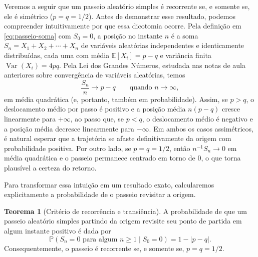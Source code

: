 \documentclass[12pt,portuguese]{article}
\theoremstyle{definition}
\newtheorem{theorem}{Teorema}
\theoremstyle{plainexercise}
\theoremstyle{starredexercise}
\theoremstyle{definition}
\begin{document}
Veremos a seguir que um passeio aleatório simples é recorrente se, e somente se,
ele é simétrico ($p = q = 1/2$). Antes de demonstrar esse resultado, podemos
compreender intuitivamente por que essa dicotomia ocorre. Pela definição em
\eqref{eq:passeio-soma} com $S_0 = 0$, a posição no instante $n$ é a soma
$S_n = X_1 + X_2 + \cdots + X_n$ de variáveis aleatórias independentes e
identicamente distribuídas, cada uma com média $\mathbb{E}[X_i] = p - q$ e
variância finita $\operatorname{Var}(X_i) = 4pq$. Pela Lei dos Grandes Números,
estudada nas notas de aula anteriores sobre convergência de variáveis
aleatórias, temos
\[
\frac{S_n}{n} \to p - q
\qquad\text{quando } n \to \infty,
\]
em média quadrática (e, portanto, também em probabilidade). Assim, se $p > q$,
o deslocamento médio por passo é positivo e a posição média $n(p - q)$ cresce
linearmente para $+\infty$, ao passo que, se $p < q$, o deslocamento médio é
negativo e a posição média decresce linearmente para $-\infty$. Em ambos os
casos assimétricos, é natural esperar que a trajetória se afaste
definitivamente da origem com probabilidade positiva. Por outro lado, se
$p = q = 1/2$, então $n^{-1} S_n \to 0$ em média quadrática e o passeio
permanece centrado em torno de $0$, o que torna plausível a certeza do
retorno.

Para transformar essa intuição em um resultado exato, calcularemos explicitamente
a probabilidade de o passeio revisitar a origem.

\begin{theorem}[Critério de recorrência e transiência]\label{thm:recorrencia-transiencia}
A probabilidade de que um passeio aleatório simples partindo da origem revisite
seu ponto de partida em algum instante positivo é dada por
\begin{equation}\label{eq:prob-retorno}
\mathbb{P}(S_n = 0 \text{ para algum } n \geqslant 1 \mid S_0 = 0)
= 1 - |p - q|.
\end{equation}
Consequentemente, o passeio é recorrente se, e somente se, $p = q = 1/2$.
\end{theorem}
\end{document}
